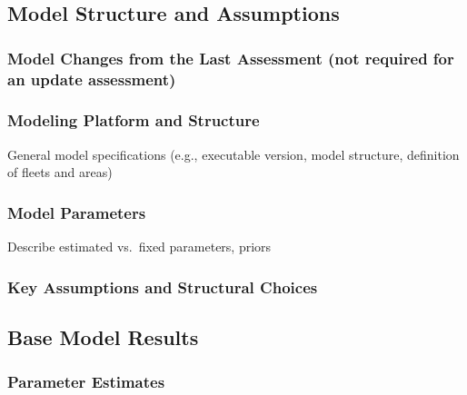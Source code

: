 \documentclass[11pt,
  english,
  letterpaper,
]{article}
\begin{document}
\hypertarget{model-structure-and-assumptions}{%
\subsection{Model Structure and Assumptions}\label{model-structure-and-assumptions}}

\hypertarget{model-changes-from-the-last-assessment-not-required-for-an-update-assessment}{%
\subsubsection{Model Changes from the Last Assessment (not required for an update assessment)}\label{model-changes-from-the-last-assessment-not-required-for-an-update-assessment}}

\hypertarget{modeling-platform-and-structure}{%
\subsubsection{Modeling Platform and Structure}\label{modeling-platform-and-structure}}

General model specifications (e.g., executable version, model structure, definition of fleets and areas)

\hypertarget{model-parameters}{%
\subsubsection{Model Parameters}\label{model-parameters}}

Describe estimated vs.~fixed parameters, priors

\hypertarget{key-assumptions-and-structural-choices}{%
\subsubsection{Key Assumptions and Structural Choices}\label{key-assumptions-and-structural-choices}}

\hypertarget{base-model-results}{%
\subsection{Base Model Results}\label{base-model-results}}

\hypertarget{parameter-estimates}{%
\subsubsection{Parameter Estimates}\label{parameter-estimates}}
\end{document}
